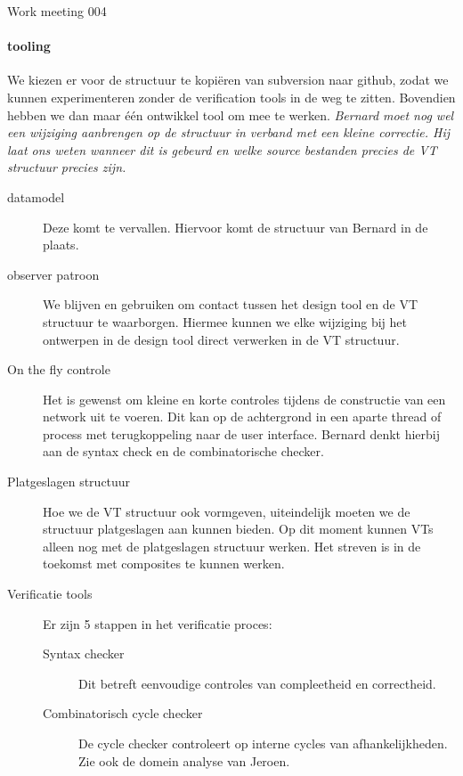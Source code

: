 \documentclass[a4paper,final]{article}
\begin{document}
\begin{Minutes}{Work meeting 004}
\paragraph{tooling} We kiezen er voor de structuur te kopi\"{e}ren van subversion naar
github, zodat we kunnen experimenteren zonder de verification tools in de weg te zitten.
Bovendien hebben we dan maar \'e\'en ontwikkel tool om mee te werken. \textit{Bernard moet nog
wel een wijziging aanbrengen op de structuur in verband met een kleine correctie. Hij
laat ons weten wanneer dit is gebeurd en welke source bestanden precies de VT structuur 
precies zijn.}


\begin{description}

	\item[ datamodel] Deze komt te vervallen. Hiervoor komt de structuur van Bernard
	in de plaats.
	
	\item[observer patroon] We blijven \signal en \slot gebruiken om contact tussen
	het design tool en de VT structuur te waarborgen. Hiermee kunnen we elke wijziging
	bij het ontwerpen in de design tool direct verwerken in de VT structuur.
	
	\item[On the fly controle] Het is gewenst om kleine en korte controles tijdens de 
	constructie van een network uit te voeren. Dit kan op de achtergrond in een aparte
	thread of process met terugkoppeling naar de user interface. Bernard denkt hierbij
	aan de syntax check en de combinatorische checker.
	
	\item[Platgeslagen structuur] Hoe we de VT structuur ook vormgeven, uiteindelijk
	moeten we de structuur platgeslagen aan kunnen bieden. Op dit moment kunnen VTs
	alleen nog met de platgeslagen structuur werken. Het streven is in de toekomst 
	met composites te kunnen werken.
	
	\item[Verificatie tools] Er zijn 5 stappen in het verificatie proces:
	
	\begin{description}
	
		\item[Syntax checker] Dit betreft eenvoudige controles van compleetheid en 
		correctheid.
		
		\item[Combinatorisch cycle checker] De cycle checker controleert op interne 
		cycles van afhankelijkheden. Zie ook de domein analyse van Jeroen.
		

\end{description}
\end{description}
\end{Minutes}
\end{document}
